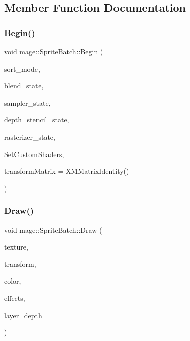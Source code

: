 \subsection{Member Function Documentation}
\hypertarget{classmage_1_1_sprite_batch_acd323454aa86dfeb598e1c6ab573f68f}{}\label{classmage_1_1_sprite_batch_acd323454aa86dfeb598e1c6ab573f68f} 
\subsubsection{\texorpdfstring{Begin()}{Begin()}}
{\footnotesize\ttfamily void mage\+::\+Sprite\+Batch\+::\+Begin (\begin{DoxyParamCaption}\item[{\hyperlink{namespacemage_a256fa5833eecc408923de7ffadb5e014}{Sprite\+Sort\+Mode}}]{sort\+\_\+mode,  }\item[{I\+D3\+D11\+Blend\+State $\ast$}]{blend\+\_\+state,  }\item[{I\+D3\+D11\+Sampler\+State $\ast$}]{sampler\+\_\+state,  }\item[{I\+D3\+D11\+Depth\+Stencil\+State $\ast$}]{depth\+\_\+stencil\+\_\+state,  }\item[{I\+D3\+D11\+Rasterizer\+State $\ast$}]{rasterizer\+\_\+state,  }\item[{std\+::function$<$ void() $>$}]{Set\+Custom\+Shaders,  }\item[{X\+M\+M\+A\+T\+R\+IX}]{transform\+Matrix = {\ttfamily XMMatrixIdentity()} }\end{DoxyParamCaption})}

\hypertarget{classmage_1_1_sprite_batch_aa877dd94078b932b94c9f27e741dfa41}{}\label{classmage_1_1_sprite_batch_aa877dd94078b932b94c9f27e741dfa41} 
\subsubsection{\texorpdfstring{Draw()}{Draw()}}
{\footnotesize\ttfamily void mage\+::\+Sprite\+Batch\+::\+Draw (\begin{DoxyParamCaption}\item[{I\+D3\+D11\+Shader\+Resource\+View $\ast$}]{texture,  }\item[{const \hyperlink{structmage_1_1_sprite_transform}{Sprite\+Transform} \&}]{transform,  }\item[{X\+M\+V\+E\+C\+T\+OR}]{color,  }\item[{\hyperlink{namespacemage_a06ff9ac76b1e0636cc8949c3f0d4ac46}{Sprite\+Effects}}]{effects,  }\item[{float}]{layer\+\_\+depth }\end{DoxyParamCaption})}

